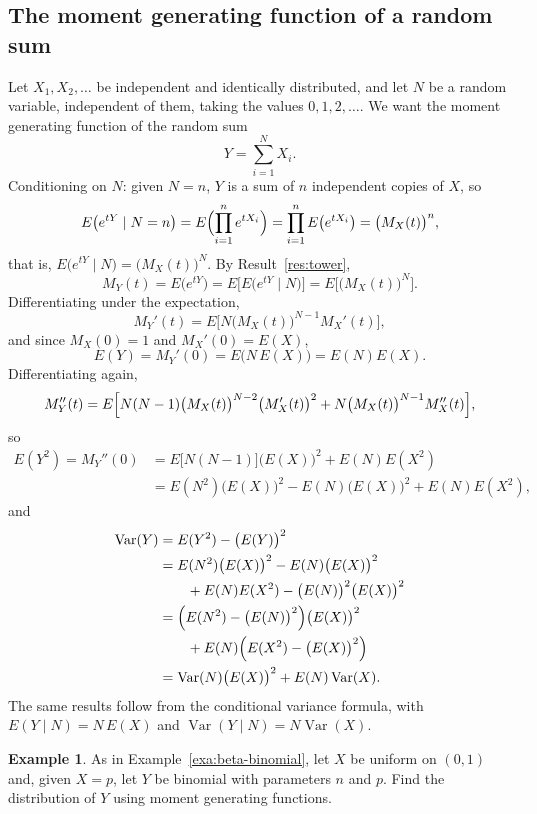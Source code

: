 \documentclass[11pt,a4paper]{article}
\theoremstyle{definition}
\newtheorem{exa}[thm]{Example}
\DeclareMathOperator{\Var}{Var}
\begin{document}
\subsection{The moment generating function of a random sum}
Let $X_1, X_2, \dots$ be independent and identically distributed, and let $N$ be a random variable,
independent of them, taking the values $0, 1, 2, \dots$. We want the moment generating function of the random sum
\[
Y = \sum_{i=1}^NX_i .
\]
Conditioning on $N$: given $N = n$, $Y$ is a sum of $n$ independent copies of $X$, so
\[
E\bigl(e^{tY} \mid N = n\bigr) = E\Bigl(\prod_{i=1}^ne^{tX_i}\Bigr) = \prod_{i=1}^nE\bigl(e^{tX_i}\bigr) = \bigl(M_X(t)\bigr)^n ,
\]
that is, $E\bigl(e^{tY} \mid N\bigr) = \bigl(M_X(t)\bigr)^N$. By Result~\ref{res:tower},
\[
M_Y(t) = E\bigl(e^{tY}\bigr) = E\bigl[E\bigl(e^{tY} \mid N\bigr)\bigr] = E\bigl[\bigl(M_X(t)\bigr)^N\bigr] .
\]
Differentiating under the expectation,
\[
M_Y'(t) = E\bigl[N\bigl(M_X(t)\bigr)^{N-1}M_X'(t)\bigr] ,
\]
and since $M_X(0) = 1$ and $M_X'(0) = E(X)$,
\[
E(Y) = M_Y'(0) = E\bigl(N\,E(X)\bigr) = E(N)E(X) .
\]
Differentiating again,
\[
M_Y''(t) = E\Bigl[N(N - 1)\bigl(M_X(t)\bigr)^{N-2}\bigl(M_X'(t)\bigr)^2 + N\bigl(M_X(t)\bigr)^{N-1}M_X''(t)\Bigr] ,
\]
so
\begin{align*}
E(Y^2) = M_Y''(0) &= E\bigl[N(N - 1)\bigr]\bigl(E(X)\bigr)^2 + E(N)E(X^2) \\
&= E(N^2)\bigl(E(X)\bigr)^2 - E(N)\bigl(E(X)\bigr)^2 + E(N)E(X^2) ,
\end{align*}
and
\begin{align*}
\Var(Y) &= E(Y^2) - \bigl(E(Y)\bigr)^2 \\
&= E(N^2)\bigl(E(X)\bigr)^2 - E(N)\bigl(E(X)\bigr)^2 \\
&\qquad + E(N)E(X^2) - \bigl(E(N)\bigr)^2\bigl(E(X)\bigr)^2 \\
&= \Bigl(E(N^2) - \bigl(E(N)\bigr)^2\Bigr)\bigl(E(X)\bigr)^2 \\
&\qquad + E(N)\Bigl(E(X^2) - \bigl(E(X)\bigr)^2\Bigr) \\
&= \Var(N)\bigl(E(X)\bigr)^2 + E(N)\Var(X) .
\end{align*}
The same results follow from the conditional variance formula, with $E(Y \mid N) = N\,E(X)$ and $\Var(Y \mid N) = N\Var(X)$.

\begin{exa}\label{exa:beta-binomial-mgf}
As in Example~\ref{exa:beta-binomial}, let $X$ be uniform on $(0, 1)$ and, given $X = p$, let $Y$ be binomial with parameters $n$ and $p$. Find the distribution
of $Y$ using moment generating functions.
\end{exa}
\end{document}
